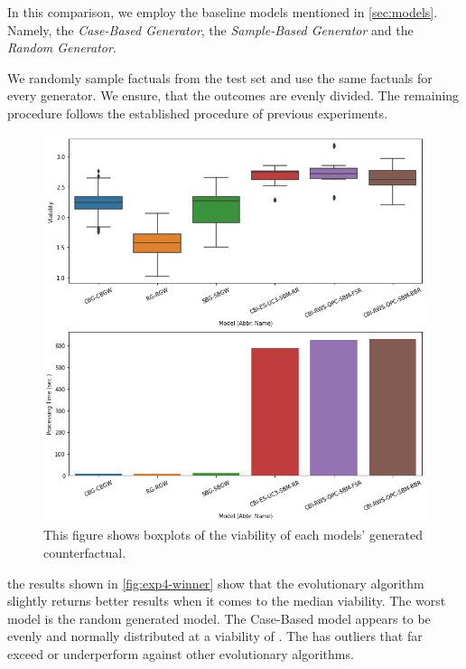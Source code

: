 \documentclass[./../../paper.tex]{subfiles}
\begin{document}
In this comparison, we employ the baseline models mentioned in \autoref{sec:models}. Namely, the \emph{Case-Based Generator}, the \emph{Sample-Based Generator} and the \emph{Random Generator}. 

We randomly sample  factuals from the test set and use the same factuals for every generator. We ensure, that the outcomes are evenly divided. The remaining procedure follows the established procedure of previous experiments.

\begin{figure}[htbp]
    \centering
    \includegraphics[width=\textwidth]{figures/generated/exp4_winner_overall.png}
    \caption{This figure shows boxplots of the viability of each models' generated counterfactual.}
    \label{fig:exp4-winner}
\end{figure}

\noindent the results shown in \autoref{fig:exp4-winner} show that the evolutionary algorithm  slightly returns better results when it comes to the median viability. The worst model is the random generated model. The Case-Based model appears to be evenly and normally distributed at a viability of . The  has outliers that far exceed or underperform against other evolutionary algorithms. 
\end{document}
